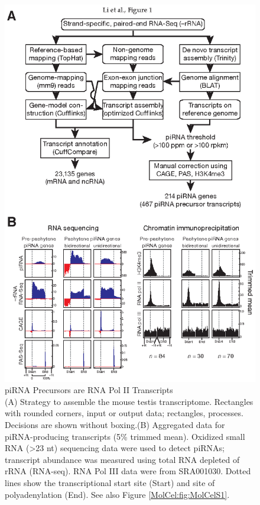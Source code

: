     \begin{figure} %
      \centering 
      \includegraphics{Figures/MolCel/MolCel2013_Fig1.eps}
      \caption[piRNA Precursors are RNA Pol II Transcripts]
      {
        piRNA Precursors are RNA Pol II Transcripts\\[0.25cm]
        (A) Strategy to assemble the mouse testis transcriptome. Rectangles with rounded corners, input or output data; rectangles, processes. Decisions are shown without boxing.(B) Aggregated data for piRNA-producing transcripts (5\% trimmed mean). Oxidized small RNA (>23 nt) sequencing data were used to detect piRNAs; transcript abundance was measured using total RNA depleted of rRNA (RNA-seq). RNA Pol III data were from SRA001030. Dotted lines show the transcriptional start site (Start) and site of polyadenylation (End). See also Figure \ref{MolCel:fig:MolCelS1}.
        }
      \label{MolCel:fig:MolCelF1}
      \end{figure}

